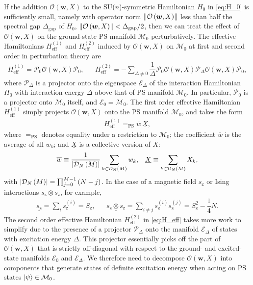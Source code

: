 \documentclass[nofootinbib,notitlepage,11pt]{revtex4-2}
\renewcommand{\t}{\text} %
\newcommand{\f}[2]{\dfrac{#1}{#2}} %
\newcommand{\p}[1]{\left(#1\right)} %
\newcommand{\m}{\bm} %
\newcommand{\1}{\mathds{1}}
\newcommand{\z}{\text{z}}
\newcommand{\D}{\mathcal{D}}
\newcommand{\E}{\mathcal{E}}
\newcommand{\M}{\mathcal{M}}
\renewcommand{\O}{\mathcal{O}}
\renewcommand{\P}{\mathcal{P}}
\newcommand{\EQPS}{=_{\text{PS}}}
\newcommand{\col}{\underline}
\newcommand{\mean}{\overline}
\begin{document}
If the addition $\O\p{\m w,X}$ to the SU($n$)-symmetric Hamiltonian $H_0$ in \eqref{eq:H_0} is sufficiently small, namely with operator norm $\norm{\O\p{\m w,X}}$ less than half the spectral gap $\Delta_{\t{gap}}$ of $H_0$, $\norm{\O\p{\m w,X}}<\Delta_{\t{gap}}/2$, then we can treat the effect of $\O\p{\m w,X}$ on the ground-state PS manifold $\M_0$ perturbatively.
The effective Hamiltonians $H_{\t{eff}}^{(1)}$ and $H_{\t{eff}}^{(2)}$ induced by $\O\p{\m w,X}$ on $\M_0$ at first and second order in perturbation theory are\cite{bravyi2011schrieffer}
\begin{align}
  H_{\t{eff}}^{(1)} = \P_0 \O\p{\m w,X} \P_0,
  &&
  H_{\t{eff}}^{(2)} = - \sum_{\Delta\ne0}
  \f1\Delta \P_0 \O\p{\m w,X} \P_\Delta \O\p{\m w,X} \P_0,
  \label{eq:H_eff}
\end{align}
where $\P_\Delta$ is a projector onto the eigenspace $\E_\Delta$ of the interaction Hamiltonian $H_0$ with interaction energy $\Delta$ above that of PS manifold $\M_0$.
In particular, $\P_0$ is a projector onto $\M_0$ itself, and $\E_0=\M_0$.
The first order effective Hamiltonian $H_{\t{eff}}^{(1)}$ simply projects $\O\p{\m w,X}$ onto the PS manifold $\M_0$, and takes the form
\begin{align}
  H_{\t{eff}}^{(1)} \EQPS \mean w \, \col X,
  \label{eq:H_eff_1}
\end{align}
where $\EQPS$ denotes equality under a restriction to $\M_0$; the coefficient $\mean w$ is the average of all $w_k$; and $\col X$ is a collective version of $X$:
\begin{align}
  \mean w \equiv \f1{\abs{\D_N\p{M}}}
  \sum_{k\in\D_N\p{M}} w_k,
  &&
  \col X \equiv \sum_{k\in\D_N\p{M}} X_k,
  \label{eq:mean_col}
\end{align}
with $\abs{\D_N\p{M}}=\prod_{j=0}^{M-1}\p{N-j}$.
In the case of a magnetic field $s_\z$ or Ising interactions $s_\z\otimes s_\z$, for example,
\begin{align}
  \col{s_\z} = \sum_i s_\z^{(i)} = S_\z,
  &&
  \col{s_\z\otimes s_\z}
  = \sum_{i\ne j} s_\z^{(i)} s_\z^{(j)}
  = S_\z^2 - \f14 N.
\end{align}
The second order effective Hamiltonian $H_{\t{eff}}^{(2)}$ in \eqref{eq:H_eff} takes more work to simplify due to the presence of a projector $\P_\Delta$ onto the manifold $\E_\Delta$ of states with excitation energy $\Delta$.
This projector essentially picks off the part of $\O\p{\m w,X}$ that is strictly off-diagonal with respect to the ground- and excited-state manifolds $\E_0$ and $\E_\Delta$.
We therefore need to decompose $\O\p{\m w,X}$ into components that generate states of definite excitation energy when acting on PS states $\ket\psi\in\M_0$.
\end{document}

